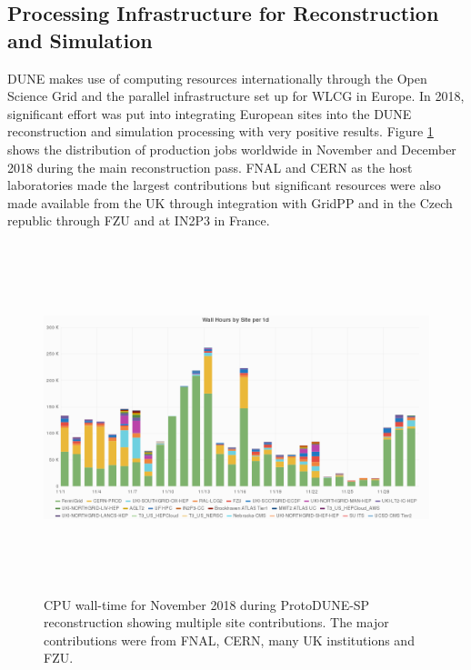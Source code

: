  




\subsection{Processing Infrastructure for Reconstruction and Simulation}
\label{ch-comp-processing}
DUNE makes use of computing resources internationally through the Open Science Grid and the parallel infrastructure set up for WLCG in Europe.  In 2018, significant effort was put into integrating European sites into the DUNE reconstruction and simulation processing with very positive results.  
Figure \ref{fig:ch-exec-comp-cpupie} shows the distribution of production jobs worldwide in November and December 2018 during the main reconstruction pass.  FNAL and CERN as the host laboratories made the largest contributions but significant resources were also made available from the UK through integration with GridPP and in the Czech republic through FZU and at IN2P3 in France. 

\begin{figure}[htp]
\centering
\includegraphics[height=4in]{graphics/comp-vo-summary.png}
\caption{CPU wall-time for November 2018 during ProtoDUNE-SP reconstruction showing multiple site contributions.  The major contributions were from FNAL, CERN, many UK institutions and FZU.}
\label{fig:ch-exec-comp-cpupie}
\end{figure}

